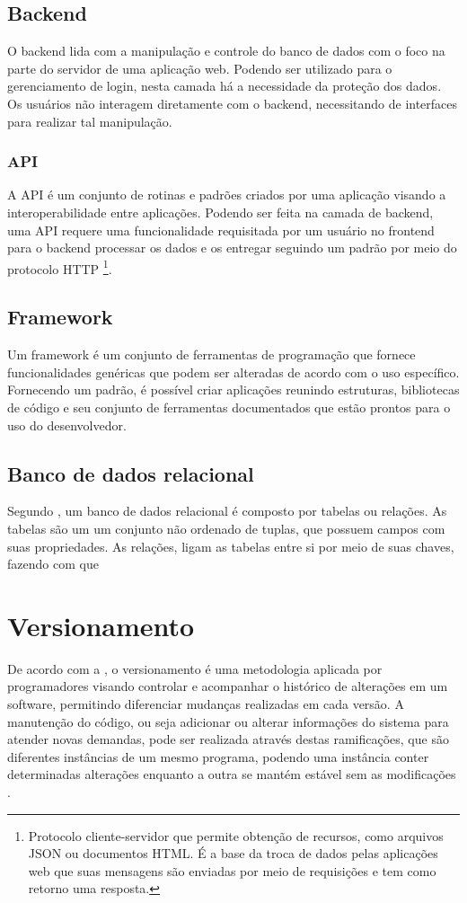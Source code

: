 \subsection{Backend}
O backend lida com a manipulação e controle do banco de dados com o foco na parte do servidor de uma aplicação web. Podendo ser utilizado para o gerenciamento de login, nesta camada há a necessidade da proteção dos dados. Os usuários não interagem diretamente com o backend, necessitando de interfaces para realizar tal manipulação.

\subsubsection{API}
A API é um conjunto de rotinas e padrões criados por uma aplicação visando a interoperabilidade entre aplicações. Podendo ser feita na camada de backend, uma API requere uma funcionalidade requisitada por um usuário no frontend para o backend processar os dados e os entregar seguindo um padrão por meio do protocolo HTTP
\footnote{Protocolo cliente-servidor que permite obtenção de recursos, como arquivos JSON ou documentos HTML. É a base da troca de dados pelas aplicações web que suas mensagens são enviadas por meio de requisições e tem como retorno uma resposta.\cite{HTTP} }\cite{BEECODE}.

\subsection{Framework}
Um framework é um conjunto de ferramentas de programação que fornece funcionalidades genéricas que podem ser alteradas de acordo com o uso específico. Fornecendo um padrão, é possível criar aplicações reunindo estruturas, bibliotecas de código e seu conjunto de ferramentas documentados que estão prontos para o uso do desenvolvedor.

\subsection{Banco de dados relacional}
Segundo , um banco de dados relacional é composto por tabelas ou relações. As tabelas são um um conjunto não ordenado de tuplas, que possuem campos com suas propriedades. As relações, ligam as tabelas entre si por meio de suas chaves, fazendo com que 
\section{Versionamento}
De acordo com a , o versionamento é uma metodologia aplicada por programadores visando controlar e acompanhar o histórico de alterações em um software, permitindo diferenciar mudanças realizadas em cada versão. A manutenção do código, ou seja adicionar ou alterar informações do sistema para atender novas demandas, pode ser realizada através destas ramificações, que são diferentes instâncias de um mesmo programa, podendo uma instância conter determinadas alterações enquanto a outra se mantém estável sem as modificações \cite{SOMOSTERA}.